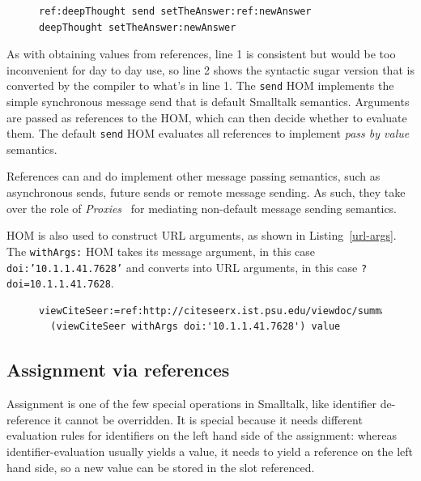 \documentclass{acm_proc_article-sp}
\begin{document}
\begin{figure}[htbp]
\begin{lstlisting}[style=numbers,label=message-via-ref,caption=Message sending via reference and with syntactic sugar]
ref:deepThought send setTheAnswer:ref:newAnswer
deepThought setTheAnswer:newAnswer
\end{lstlisting}
\end{figure}

As with obtaining values from references, line 1 is consistent but would be too inconvenient for day to day use,
so line 2 shows the syntactic sugar version that is converted by the compiler to what's in line 1.  The {\tt send}
HOM implements the simple synchronous message send that is default Smalltalk semantics.   Arguments
are passed as references to the HOM, which can then decide whether to evaluate them.  The default {\tt send}
HOM evaluates all references to implement \emph{pass by value} semantics.

References can and do implement other message passing semantics, such as asynchronous sends, future
sends or remote message sending.  As such, they take over the role of \emph{Proxies}~\cite{VanCutsemMiller} for mediating non-default
message sending semantics.  


HOM is also used to construct URL arguments, as shown in Listing~\ref{url-args}.  The {\tt withArgs:}
HOM takes its message argument, in this case {\tt doi:'10.1.1.41.7628'} and converts into URL arguments,
in this case {\tt ?doi=10.1.1.41.7628}.

\begin{figure}[htbp]
\begin{lstlisting}[style=numbers,label=url-args,caption=URL arguments via reference and higher order message.]
  viewCiteSeer:=ref:http://citeseerx.ist.psu.edu/viewdoc/summary.
  (viewCiteSeer withArgs doi:'10.1.1.41.7628') value
\end{lstlisting}
\end{figure}


\subsection{Assignment via references}

Assignment is one of the few special operations in Smalltalk, like identifier de-reference it cannot be overridden.
It is special because it needs different evaluation rules for identifiers on the left hand side of the assignment:
whereas identifier-evaluation usually yields a value, it needs to yield a reference on the left hand side, so
a new value can be stored in the slot referenced.
\end{document}
